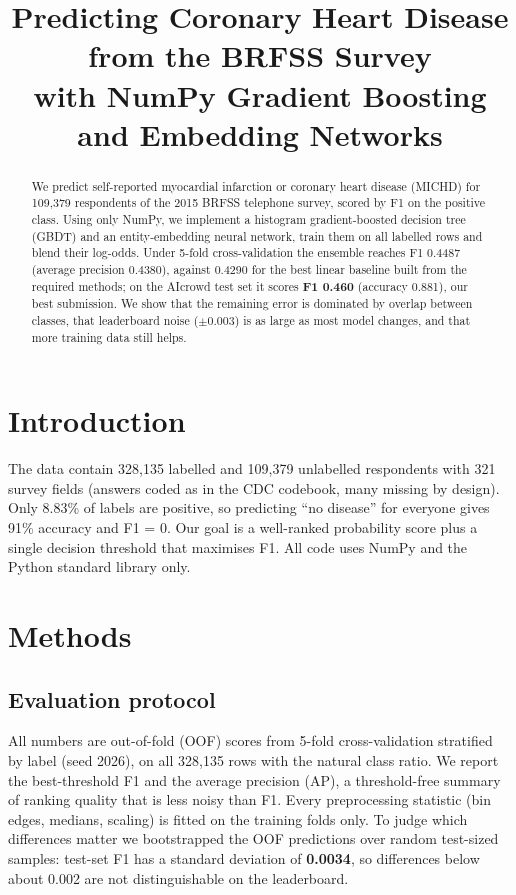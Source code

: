 \documentclass[10pt,conference,compsocconf]{IEEEtran}
\begin{document}
\title{Predicting Coronary Heart Disease from the BRFSS Survey\\with NumPy Gradient Boosting and Embedding Networks}
\author{
}
\maketitle

\begin{abstract}
We predict self-reported myocardial infarction or coronary heart disease (MICHD) for
109,379 respondents of the 2015 BRFSS telephone survey, scored by F1 on the positive class.
Using only NumPy, we implement a histogram gradient-boosted decision tree (GBDT) and an
entity-embedding neural network, train them on all labelled rows and blend their log-odds.
Under 5-fold cross-validation the ensemble reaches F1 0.4487 (average precision
0.4380), against 0.4290 for the best linear baseline built from the required methods;
on the AIcrowd test set it scores \textbf{F1 0.460} (accuracy 0.881), our best submission. We show that the remaining error is dominated by overlap between classes, that
leaderboard noise ($\pm0.003$) is as large as most model changes, and that more training
data still helps.
\end{abstract}

\section{Introduction}
The data contain 328,135 labelled and 109,379 unlabelled respondents with 321 survey fields
(answers coded as in the CDC codebook, many missing by design). Only 8.83\% of labels are
positive, so predicting ``no disease'' for everyone gives 91\% accuracy and F1 = 0. Our
goal is a well-ranked probability score plus a single decision threshold that maximises
F1. All code uses NumPy and the Python standard library only.

\section{Methods}
\subsection{Evaluation protocol}
All numbers are out-of-fold (OOF) scores from 5-fold cross-validation stratified by label
(seed 2026), on all 328,135 rows with the natural class ratio. We report the best-threshold
F1 and the average precision (AP), a threshold-free summary of ranking quality that is less
noisy than F1. Every preprocessing statistic (bin edges, medians, scaling) is fitted on the
training folds only. To judge which differences matter we bootstrapped the OOF predictions
over random test-sized samples: test-set F1 has a standard deviation of \textbf{0.0034},
so differences below about 0.002 are not distinguishable on the leaderboard.
\end{document}

